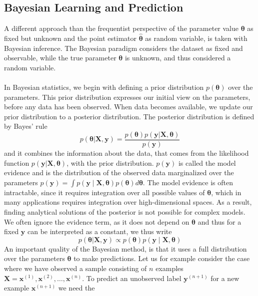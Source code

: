 \subsection{Bayesian Learning and Prediction}
A different approach than the frequentist perspective of the parameter value $\boldsymbol{\theta}$ as fixed but unknown and the point estimator $\hat{\boldsymbol{\theta}}$ as random variable, is taken with Bayesian inference. The Bayesian paradigm considers the dataset as fixed and observable, while the true parameter $\boldsymbol{\theta}$ is unknown, and thus considered a random variable. 
\\
\\
In Bayesian statistics, we begin with defining a prior distribution $p(\boldsymbol{\theta})$ over the parameters. This prior distribution expresses our initial view on the parameters, before any data has been observed. When data becomes available, we update our prior distribution to a posterior distribution. The posterior distribution is defined by Bayes' rule
\begin{equation*}
         p(\boldsymbol{\theta}|\boldsymbol{X},\boldsymbol{y})=\frac{p(\boldsymbol{\theta})p(\boldsymbol{y}|\boldsymbol{X},\boldsymbol{\theta})}{p(\boldsymbol{y})}
\end{equation*}
and it combines the information about the data, that comes from the likelihood function $p(\boldsymbol{y}|\boldsymbol{X},\boldsymbol{\theta})$, with the prior distribution. $p(\boldsymbol{y})$ is called the model evidence and is the distribution of the observed data marginalized over the parameters $p(\boldsymbol{y})=\int p(\boldsymbol{y}\mid \boldsymbol{X}, \boldsymbol{\theta})p(\boldsymbol{\theta})d\boldsymbol{\theta}$. The model evidence is often intractable, since it requires integration over all possible values of $\boldsymbol{\theta}$, which in many applications requires integration over high-dimensional spaces. As a result, finding analytical solutions of the posterior is not possible for complex models. 
We often ignore the evidence term, as it does not depend on $\boldsymbol{\theta}$ and thus for a fixed $\boldsymbol{y}$ can be interpreted as a constant, we thus write
\begin{equation} \label{eq:posterior}
    p(\boldsymbol{\theta}|\boldsymbol{X},\boldsymbol{y})\propto p(\boldsymbol{\theta})p(\boldsymbol{y}\mid \boldsymbol{X},\boldsymbol{\theta})
\end{equation}
An important quality of the Bayesian method, is that it uses a full distribution over the parameters $\boldsymbol{\theta}$ to make predictions. Let us for example consider the case where we have observed a sample consisting of $n$ examples $\boldsymbol{X}=\boldsymbol{x}^{(1)}, \boldsymbol{x}^{(2)},\ldots, \boldsymbol{x}^{(n)}$. To predict an unobserved label $\boldsymbol{y}^{(n+1)}$ for a new example $\boldsymbol{x}^{(n+1)}$ we need the 
